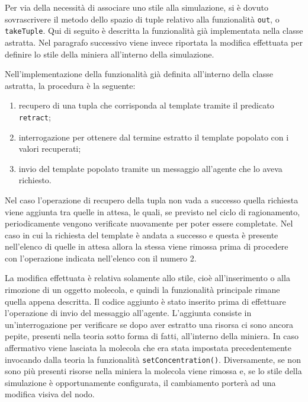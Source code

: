 Per via della necessità di associare uno stile alla simulazione, si è dovuto sovrascrivere il metodo dello spazio di tuple relativo alla funzionalità \texttt{out}, o \texttt{takeTuple}.
Qui di seguito è descritta la funzionalità già implementata nella classe astratta. Nel paragrafo successivo viene invece riportata la modifica effettuata per definire lo stile della miniera all'interno della simulazione.

Nell'implementazione della funzionalità già definita all'interno della classe astratta, la procedura è la seguente:
\begin{enumerate}
\item recupero di una tupla che corrisponda al template tramite il predicato \texttt{retract};
\item interrogazione per ottenere dal termine estratto il template popolato con i valori recuperati;
\item invio del template popolato tramite un messaggio all'agente che lo aveva richiesto.
\end{enumerate}
Nel caso l'operazione di recupero della tupla non vada a successo quella richiesta viene aggiunta tra quelle in attesa, le quali, se previsto nel ciclo di ragionamento, periodicamente vengono verificate nuovamente per poter essere completate.
Nel caso in cui la richiesta del template è andata a successo e questa è presente nell'elenco di quelle in attesa allora la stessa viene rimossa prima di procedere con l'operazione indicata nell'elenco con il numero 2.

La modifica effettuata è relativa solamente allo stile, cioè all'inserimento o alla rimozione di un oggetto molecola, e quindi la funzionalità principale rimane quella appena descritta.
Il codice aggiunto è stato inserito prima di effettuare l'operazione di invio del messaggio all'agente. L'aggiunta consiste in un'interrogazione per verificare se dopo aver estratto una risorsa ci sono ancora pepite, presenti nella teoria sotto forma di fatti, all'interno della miniera. In caso affermativo viene lasciata la molecola che era stata impostata precedentemente invocando dalla teoria la funzionalità \texttt{setConcentration()}. Diversamente, se non sono più presenti risorse nella miniera la molecola viene rimossa e, se lo stile della simulazione è opportunamente configurata, il cambiamento porterà ad una modifica visiva del nodo.

